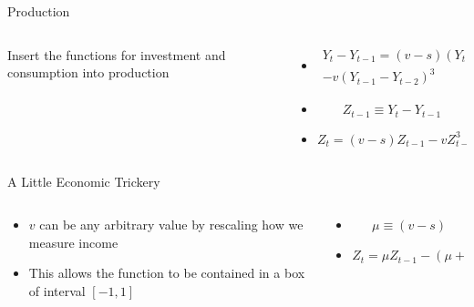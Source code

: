 \documentclass{beamer}
\begin{document}
\begin{frame}{Production}
	\begin{columns}
		\begin{column}{0.3\textwidth}
			\centering
			Insert the functions for investment and consumption into production
		\end{column}
		\begin{column}{0.7\textwidth}
			\begin{itemize}
				\item
					\begin{equation*}
						\begin{split}
						Y_t-Y_{t-1}=(v-s)(Y_{t-1}-Y_{t-2})\\
						-v(Y_{t-1}-Y_{t-2})^3
					\end{split}
					\end{equation*}
				\pause
				\item
					\begin{equation*}
						Z_{t-1}\equiv Y_t-Y_{t-1}
					\end{equation*}
				\pause
				\item
					\begin{equation*}
						Z_t=(v-s)Z_{t-1}-vZ^3_{t-1}
					\end{equation*}
			\end{itemize}
		\end{column}
	\end{columns}
\end{frame}

\begin{frame}{A Little Economic Trickery}
	\begin{columns}
		\begin{column}{0.5\textwidth}
			\begin{itemize}
				\item
					\(v\) can be any arbitrary value by rescaling how we measure income
				\item
					This allows the function to be contained in a box of interval \([-1,1]\)
			\end{itemize}
		\end{column}
		\begin{column}{0.5\textwidth}
			\begin{itemize}
				\item
					\begin{equation*}
						\mu\equiv(v-s)
					\end{equation*}
				\pause
				\item
					\begin{equation*}
						Z_t=\mu Z_{t-1}-(\mu+1)Z^3_{t-1}
					\end{equation*}
			\end{itemize}
		\end{column}
	\end{columns}
\end{frame}
\end{document}
